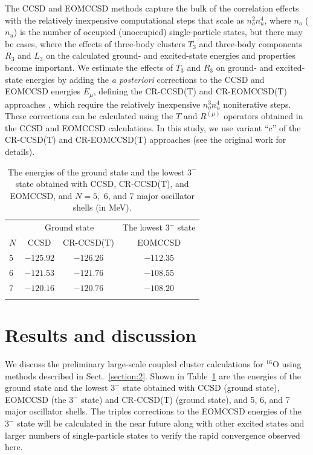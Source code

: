 \documentclass[epj]{svjour}
\begin{document}
The CCSD and EOMCCSD methods capture the bulk of the correlation effects with the
relatively inexpensive computational steps that scale as
$n_{o}^{2} n_{u}^{4}$, where $n_{o}$ ($n_{u}$) is the number of
occupied (unoccupied) single-particle states,
but there may be cases, where the effects
of three-body clusters $T_{3}$ and three-body components $R_{3}$ and $L_{3}$
on the calculated ground- and excited-state energies and properties become important.
We estimate the effects of $T_{3}$ and $R_{3}$
on ground- and excited-state energies by adding
the {\it a posteriori} corrections
to the CCSD and EOMCCSD energies $E_{\mu}$,
defining the CR-CCSD(T) and CR-EOMCCSD(T)
approaches \cite{piecuch02,creom:open,kowalski2004},
which require the
relatively inexpensive $n_{o}^{3} n_{u}^{4}$ noniterative steps.
These corrections can be calculated using the $T$ and $R^{(\mu)}$ operators
obtained in the CCSD and EOMCCSD calculations.
In this study, we use variant ``c'' of the
CR-CCSD(T) and CR-EOMCCSD(T) approaches
\cite{kowalski04} (see the original work
\cite{kowalski2004}
for details).

\begin{table}
\caption{The energies of the ground state and the lowest
$3^{-}$ state obtained with CCSD, CR-CCSD(T), and
EOMCCSD, and $N=5,$ 6, and 7 major oscillator shells
(in MeV).}
\label{table:2}
\begin{tabular}{lccc}
\hline\noalign{\smallskip}
    & \multicolumn{2}{c}{Ground state} & The lowest $3^{-}$ state \\
\cline{2-3}
\cline{4-4}
$N$ & CCSD & CR-CCSD(T)                & EOMCCSD \\
\noalign{\smallskip}\hline\noalign{\smallskip}
5 & $-125.92$ & $-126.26$ & $-112.35$ \\
6 & $-121.53$ & $-121.76$ & $-108.55$ \\
7 & $-120.16$ & $-120.76$ & $-108.20$ \\
\noalign{\smallskip}\hline
\end{tabular}
\end{table}

\section{Results and discussion}
\label{section:3}

We discuss the preliminary large-scale coupled cluster calculations
for $^{16}$O
using methods described in Sect.~\ref{section:2}. Shown in Table~\ref{table:2}
are the energies of the ground state and the lowest $3^{-}$ state
obtained with CCSD (ground state), EOMCCSD (the $3^{-}$ state)
and CR-CCSD(T) (ground state), and
5, 6, and 7 major oscillator shells. The triples corrections to
the EOMCCSD energies of the $3^{-}$ state will be calculated
in the near future along with
other excited states and larger numbers of single-particle states
to verify the rapid convergence observed here.
\end{document}
